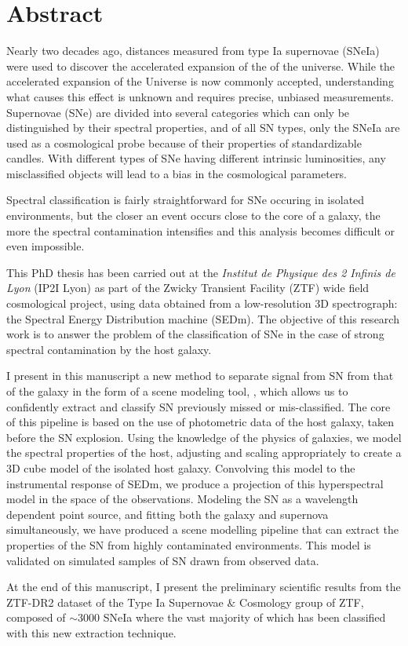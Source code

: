 \documentclass[../main/main.tex]{subfiles}
\begin{document}
\chapter*{Abstract}
\label{chap:abstract}
\vspace{2cm}
Nearly two decades ago, distances measured from type Ia supernovae 
(SNeIa) were used to discover the accelerated expansion of the
of the universe. While the accelerated expansion of the Universe is now
commonly accepted, understanding what causes this effect is unknown
and requires precise, unbiased measurements. 
Supernovae (SNe) are divided into several categories which can only be
distinguished by their spectral properties, and of all SN types, only the SNeIa
are used as a cosmological probe because of their properties of
standardizable candles. With different types of SNe
having different intrinsic luminosities,
any misclassified objects will lead to a bias in the cosmological
parameters.  

Spectral classification is fairly straightforward for SNe occuring in
isolated environments, but the closer an event occurs close to the core of a
galaxy, the more the spectral contamination intensifies and this analysis
becomes difficult or even impossible.

This PhD thesis has been carried out at the \textit{Institut de Physique des 2
Infinis de Lyon} (IP2I Lyon) as part of the Zwicky Transient Facility (ZTF) wide field cosmological
project, using data obtained from a low-resolution 3D
spectrograph: the Spectral Energy Distribution machine
(SEDm). The objective of this research work is to answer the
problem of the classification of SNe in the case of strong spectral contamination by the host galaxy. 

I present in this manuscript a new method to separate signal from SN
from that of the galaxy in the form
of a scene modeling tool, \hypergal, which allows us to confidently
extract and classify SN previously missed or mis-classified. The core of
this pipeline is based on the use of
photometric data of the host galaxy, taken before the
SN explosion. Using the knowledge of the physics of galaxies, we model
the spectral properties of the host, adjusting and scaling appropriately
to create a 3D cube model of the
isolated host galaxy. Convolving this model to the instrumental response
of SEDm, we produce a projection of this hyperspectral model in the
space of the observations. Modeling the SN as a wavelength dependent
point source, and fitting both the galaxy and supernova simultaneously,
we have produced a scene modelling pipeline that can extract the
properties of the SN from highly contaminated environments. 
This model is validated on simulated samples of SN drawn from observed
data.

At the end of this manuscript, I present the preliminary scientific results from the
ZTF-DR2 dataset of the Type Ia Supernovae $\&$ Cosmology group
of ZTF, composed of $\sim3000$ SNeIa where the vast majority of which has been classified with this
new extraction technique.
\end{document}
